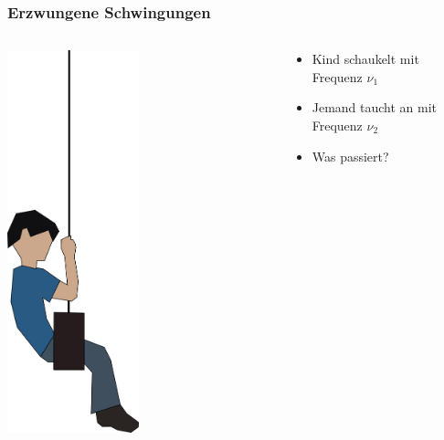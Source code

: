 \documentclass{beamer}
\begin{document}
\begin{frame}
\frametitle{Erzwungene Schwingungen}

\begin{columns}[c]

\begin{column}{3cm}

\begin{center}
\includegraphics[width=0.5\textwidth]{kind_schaukel.png}
\end{center}

\end{column}

\begin{column}{7cm}

\begin{itemize}
\item
Kind schaukelt mit Frequenz \(\nu_1\)
\item
Jemand  taucht an mit Frequenz \(\nu_2\)
\item
Was passiert?
\end{itemize}

\end{column}

\end{columns}
\end{frame}
\end{document}
